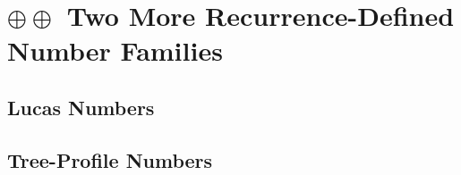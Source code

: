 
\chapter{$\oplus \oplus$ Two More Recurrence-Defined Number Families}

\section{Lucas Numbers}
\label{sec:Lucas-numbers}




\section{Tree-Profile Numbers}
\label{sec:Tree-Profile-numbers}


